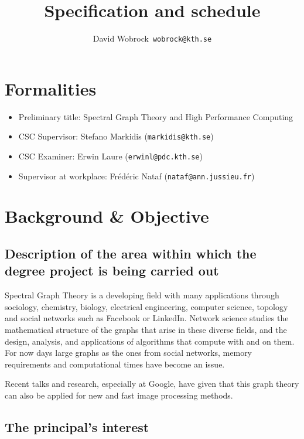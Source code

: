 \documentclass[12pt]{article}
\begin{document}
\title{Specification and schedule}
\author{David Wobrock\ \texttt{wobrock@kth.se}}

\maketitle

\section*{Formalities}

\begin{itemize}
 \item Preliminary title: Spectral Graph Theory and High Performance Computing
 \item CSC Supervisor: Stefano Markidis (\texttt{markidis@kth.se})
 \item CSC Examiner: Erwin Laure (\texttt{erwinl@pdc.kth.se})
 \item Supervisor at workplace: Fr\'{e}d\'{e}ric Nataf (\texttt{nataf@ann.jussieu.fr})
\end{itemize}

\section*{Background \& Objective}

\subsection*{Description of the area within which the degree project is being carried out}

Spectral Graph Theory is a developing field with many applications through sociology, chemistry, biology, electrical engineering, computer science, topology and social networks such as Facebook or LinkedIn.
Network science studies the mathematical structure of the graphs that arise in these diverse fields, and the design, analysis, and applications of algorithms that compute with and on them.
For now days large graphs as the ones from social networks, memory requirements and computational times have become an issue.

Recent talks and research, especially at Google, have given that this graph theory can also be applied for new and fast image processing methods.

\subsection*{The principal's interest}
\end{document}
